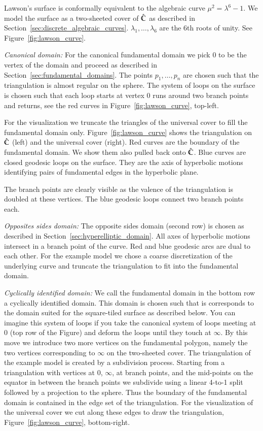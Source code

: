\documentclass[Thesis]{subfiles}
\begin{document}
Lawson's surface is conformally equivalent to the algebraic curve $\mu^2=\lambda^6-1$.
We model the surface as a two-sheeted cover of $\hat {\mathbb C}$ as described in Section~\ref{sec:discrete_algebraic_curves}. $\lambda_1,\ldots,\lambda_6$ are the 6th roots of unity.
See Figure~\ref{fig:lawson_curve}.

\textit{Canonical domain:}
For the canonical fundamental domain we pick $0$ to be the vertex of the domain and proceed as described in Section~\ref{sec:fundamental_domains}.
The points $p_1,\ldots,p_n$ are chosen such that the triangulation is almost regular on the sphere.
The system of loops on the surface is chosen such that each loop starts at vertex $0$ runs around two branch points and returns, see the red curves in Figure~\ref{fig:lawson_curve}, top-left.

For the visualization we truncate the triangles of the universal cover to fill the fundamental domain only.
Figure~\ref{fig:lawson_curve} shows the triangulation on $\hat {\mathbb C}$ (left) and the universal cover (right).
Red curves are the boundary of the fundamental domain.
We show them also pulled back onto $\hat {\mathbb C}$. Blue curves are closed geodesic loops on the surface.
They are the axis of hyperbolic motions identifying pairs of fundamental edges in the hyperbolic plane.

The branch points are clearly visible as the valence of the triangulation is doubled at these vertices.
The blue geodesic loops connect two branch points each.

\textit{Opposites sides domain:}
The opposite sides domain (second row) is chosen as described in Section~\ref{sec:hyperelliptic_domain}.
All axes of hyperbolic motions intersect in a branch point of the curve.
Red and blue geodesic arcs are dual to each other.
For the example model we chose a coarse discretization of the underlying curve and truncate the triangulation to fit into the fundamental domain.

\textit{Cyclically identified domain:}
We call the fundamental domain in the bottom row a cyclically identified domain.
This domain is chosen such that is corresponds to the domain suited for the square-tiled surface as described below.
You can imagine this system of loops if you take the canonical system of loops meeting at $0$ (top row of the Figure) and deform the loops until they touch at $\infty$.
By this move we introduce two more vertices on the fundamental polygon, namely the two vertices corresponding to $\infty$ on the two-sheeted cover.
The triangulation of the example model is created by a subdivision process.
Starting from  a triangulation with vertices at $0$, $\infty$, at branch points, and the mid-points on the equator in between the branch points we subdivide using a linear 4-to-1 split followed by a projection to the sphere. Thus the boundary of the fundamental domain is contained in the edge set of the triangulation. For the visualization of the universal cover we cut along these edges to draw the triangulation, Figure~\ref{fig:lawson_curve}, bottom-right.
\end{document}
